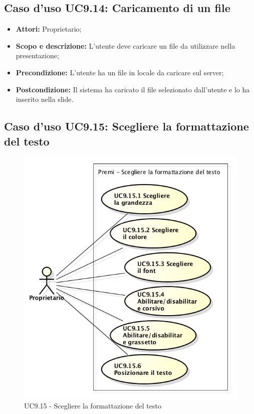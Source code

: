 \subsection{Caso d'uso UC9.14: Caricamento di un file}
\begin{itemize}
	\item \textbf{Attori:} Proprietario;
	\item \textbf{Scopo e descrizione:} L'utente deve caricare un file da utilizzare nella presentazione;
	\item \textbf{Precondizione:} L'utente ha un file in locale da caricare sul server;
	\item \textbf{Postcondizione:} Il sistema ha caricato il file selezionato dall'utente e lo ha inserito nella \gls{slide}.
\end{itemize}

\newpage
\subsection{Caso d'uso UC9.15: Scegliere la formattazione del testo}
\begin{figure}[h] 
	\centering 
	\includegraphics[scale=0.45] {img/UC9.15.png}
	\caption{UC9.15 - Scegliere la formattazione del testo}
\end{figure}

